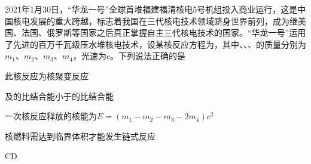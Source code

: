 2021年1月30日，“华龙一号”全球首堆福建福清核电5号机组投入商业运行，这是中国核电发展的重大跨越，标志着我国在三代核电技术领域跻身世界前列，成为继美国、法国、俄罗斯等国家之后真正掌握自主三代核电技术的国家。“华龙一号”运用了先进的百万千瓦级压水堆核电技术，设某核反应方程为，其中、、、的质量分别为\(m_1\)、\(m_2\)、\(m_3\)、\(m_4\)，光速为\(c\)。下列说法正确的是\paren[CD]
\begin{choices}
    \item 此核反应为核聚变反应
    \item {}及的比结合能小于的比结合能
    \item 一次核反应释放的核能为\(E =(m_1 - m_2 - m_3 - 2m_4)c^2\)
    \item 核燃料需达到临界体积才能发生链式反应
\end{choices}
\begin{answer}
    CD
\end{answer}
